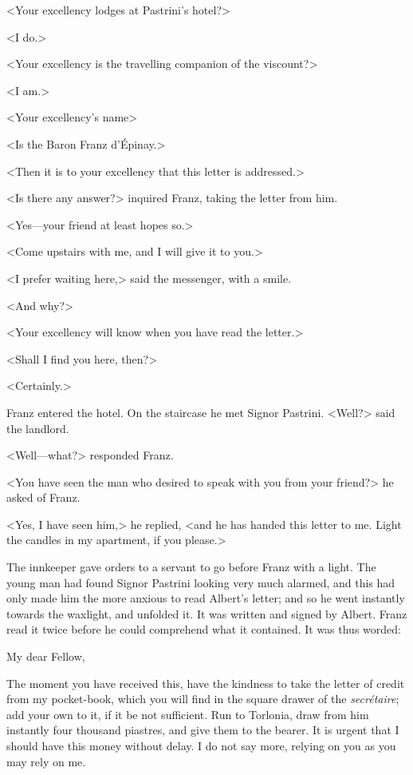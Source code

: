  <Your excellency lodges at Pastrini's hotel?> 

 <I do.> 

 <Your excellency is the travelling companion of the viscount?> 

 <I am.> 

 <Your excellency's name\longdash> 

 <Is the Baron Franz d'Épinay.>

<Then it is to your excellency that this letter is addressed.> 

 <Is there any answer?> inquired Franz, taking the letter from him. 

 <Yes—your friend at least hopes so.> 

 <Come upstairs with me, and I will give it to you.> 

 <I prefer waiting here,> said the messenger, with a smile. 

 <And why?> 

 <Your excellency will know when you have read the letter.> 

 <Shall I find you here, then?> 

 <Certainly.> 

 Franz entered the hotel. On the staircase he met Signor Pastrini. <Well?> said the landlord. 

 <Well—what?> responded Franz. 

 <You have seen the man who desired to speak with you from your friend?> he asked of Franz. 

 <Yes, I have seen him,> he replied, <and he has handed this letter to me. Light the candles in my apartment, if you please.> 

 The innkeeper gave orders to a servant to go before Franz with a light. The young man had found Signor Pastrini looking very much alarmed, and this had only made him the more anxious to read Albert's letter; and so he went instantly towards the waxlight, and unfolded it. It was written and signed by Albert. Franz read it twice before he could comprehend what it contained. It was thus worded: 

\begin{mail}{}{My dear Fellow,}

The moment you have received this, have the kindness to take the letter of credit from my pocket-book, which you will find in the square drawer of the \textit{secrétaire}; add your own to it, if it be not sufficient. Run to Torlonia, draw from him instantly four thousand piastres, and give them to the bearer. It is urgent that I should have this money without delay. I do not say more, relying on you as you may rely on me. 

\end{mail}


